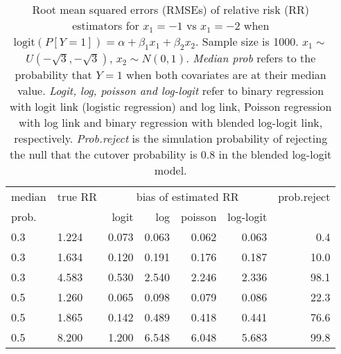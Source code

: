 \documentclass[12pt,a4paper]{article}
\begin{document}
\begin{table}[H] 
\small\sf\centering 
\caption{Root mean squared errors (RMSEs) of relative risk (RR) estimators for $x_1=-1$ vs $x_1=-2$ when $\mbox{logit}(P[Y=1])=\alpha+\beta_1 x_1 + \beta_2 x_2$. Sample size is 1000. $x_1 \sim $$U(-\sqrt{3},-\sqrt{3})$, $x_2 \sim N(0,1)$. {\it Median prob} refers to the probability that $Y=1$ when both covariates are at their median value. {\it Logit, log, poisson and log-logit} refer to binary regression with logit link (logistic regression) and log link, Poisson regression with log link and binary regression with blended log-logit link, respectively. {\it Prob.reject} is the simulation probability of rejecting the null that the cutover probability is $0.8$ in the blended log-logit model.} 
\begin{tabular}{llrrrrr} 
\toprule 
median & true RR & \multicolumn{4}{c}{bias of estimated RR} & prob.reject \\ 
prob. & & logit & log & poisson & log-logit  & \\ \midrule 
0.3 & 1.224 & 0.073 & 0.063 & 0.062 & 0.063 &  0.4 \\  
0.3 & 1.634 & 0.120 & 0.191 & 0.176 & 0.187 & 10.0 \\  
0.3 & 4.583 & 0.530 & 2.540 & 2.246 & 2.336 & 98.1 \\  
0.5 & 1.260 & 0.065 & 0.098 & 0.079 & 0.086 & 22.3 \\  
0.5 & 1.865 & 0.142 & 0.489 & 0.418 & 0.441 & 76.6 \\  
0.5 & 8.200 & 1.200 & 6.548 & 6.048 & 5.683 & 99.8 \\  
\bottomrule 
\end{tabular} 
\end{table} 
\end{document}
